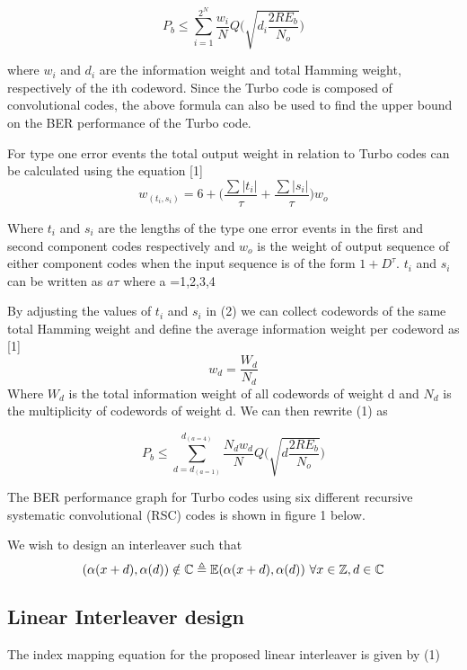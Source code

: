 \documentclass[20 pts]{article}
\begin{document}
\begin{equation}
P_b \leq \sum_{i=1}^{2^N} \frac{w_i}{N}Q\Bigg( \sqrt{d_i\frac{2RE_b}{N_o}}\Bigg)
\end{equation}

where $w_i$ and $d_i$ are the information weight and total Hamming weight, respectively of the ith codeword. Since the Turbo code is composed of convolutional codes, the above formula can also be used to find the upper bound on the BER performance of the Turbo code. 


For type one error events the total output weight in relation to Turbo codes can be calculated using the equation [1]
\begin{equation}
w_{(t_i,s_i)}=6+\Bigg( \frac{\sum \left|t_i\right|}{\tau} + \frac{\sum \left|s_i\right|}{\tau} \Bigg)w_o
\end{equation}

Where $t_i$ and $s_i$ are the lengths of the type one error events in the first and second component codes respectively and $w_o$ is the weight of output sequence of either component codes when the input sequence is of the form $1+D^\tau$. $t_i$ and $s_i$ can be written as $a\tau$ where a ={1,2,3,4}

By adjusting the values of $t_i$ and $s_i$ in (2) we can collect codewords of the same total Hamming weight and define the average information weight per codeword as [1]
$$ w_d=\frac{W_d}{N_d}$$
Where $W_d$ is the total information weight of all codewords of weight  d and $N_d$ is the multiplicity of codewords of weight d. We can then rewrite (1) as 

\begin{equation}
P_b \leq \sum_{d=d_{(a=1)}}^{d_{(a=4)}} \frac{N_dw_d}{N}Q\Bigg( \sqrt{d\frac{2RE_b}{N_o}}\Bigg)
\end{equation}

The BER performance graph for Turbo codes using six different recursive systematic convolutional (RSC) codes is shown in figure 1 below. 

We wish to design an interleaver such that $$(\alpha(x+d),\alpha(d)) \notin \mathbb{C} \triangleq \mathbb{E}(\alpha(x+d),\alpha(d)) \\\\\ \forall x \in \mathbb{Z} , d \in \mathbb{C}$$ 


\subsection{Linear Interleaver design}
The index mapping equation for the proposed linear interleaver is given by (1)
\end{document}
